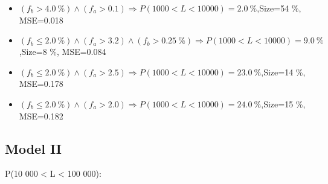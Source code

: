 \documentclass[numbered]{CSL}
\begin{document}
\begin{itemize}
\item $(f_b > 4.0~\%) \land (f_a > 0.1) \Rightarrow P(1 000 < L < 10 000) = 2.0~\%$,\hfill Size=54 \%, MSE=0.018
\item $(f_b \leq 2.0~\%) \land (f_a > 3.2) \land (f_b > 0.25~\%) \Rightarrow P(1 000 < L < 10 000) = 9.0~\%$,\hfill Size=8 \%, MSE=0.084
\item $(f_b \leq 2.0~\%) \land (f_a > 2.5) \Rightarrow P(1 000 < L < 10 000) = 23.0~\%$,\hfill Size=14 \%, MSE=0.178
\item $(f_b \leq 2.0~\%) \land (f_a > 2.0) \Rightarrow P(1 000 < L < 10 000) = 24.0~\%$,\hfill Size=15 \%, MSE=0.182
\end{itemize}

\subsection{Model II}
P(10 000 < L < 100 000):
\end{document}
